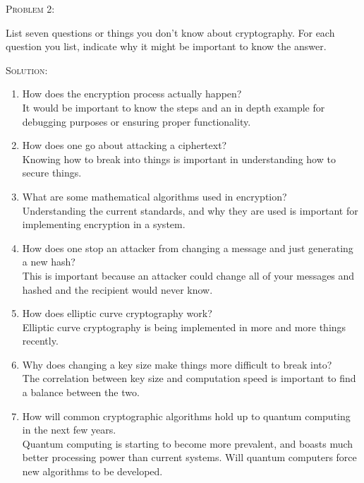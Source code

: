 \documentclass[12pt]{article}
\newenvironment{problem}[1]
{\begin{mdframed}[linewidth=0.8pt]
        \textsc{Problem #1:}

}
    {\end{mdframed}}
\newenvironment{solution}
    {\textsc{Solution:}\\}
    {\newpage}%
\begin{document}
	\begin{problem}{2}
		List seven questions or things you don't know about
		cryptography. For each question you list, indicate why
		it might be important to know the answer.
	\end{problem}
	\begin{solution}
		\begin{enumerate}
			\item How does the encryption process actually happen?\\
				It would be important to know the steps and an in
				depth example for debugging purposes or ensuring
				proper functionality.
			\item How does one go about attacking a ciphertext?\\
				Knowing how to break into things is important in
				understanding how to secure things.
			\item What are some mathematical algorithms used in encryption?\\
				Understanding the current standards, and why they are used
				is important for implementing encryption in a system.
			\item How does one stop an attacker from changing a message
				and just generating a new hash?\\
				This is important because an attacker could change all of
				your messages and hashed and the recipient would never know.
			\item How does elliptic curve cryptography work?\\
				Elliptic curve cryptography is being implemented in more and
				more things recently.
			\item Why does changing a key size make things more difficult to
				break into?\\
				The correlation between key size and computation speed is
				important to find a balance between the two.
			\item How will common cryptographic algorithms hold up to quantum
				computing in the next few years.\\
				Quantum computing is starting to become more prevalent, and
				boasts much better processing power than current systems.
				Will quantum computers force new algorithms to be developed.
		\end{enumerate}
	\end{solution}
\end{document}
